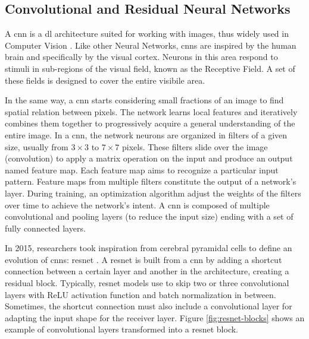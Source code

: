 \subsection{Convolutional and Residual Neural Networks}
\label{subsec:resnet}

A \gls{cnn} is a \gls{dl} architecture suited for working with images, thus widely used in Computer Vision \cite{Khan_2020}. Like other Neural Networks, \gls{cnn}s are inspired by the human brain and specifically by the visual cortex. Neurons in this area respond to stimuli in sub-regions of the visual field, known as the Receptive Field. A set of these fields is designed to cover the entire visibile area. 

In the same way, a \gls{cnn} starts considering small fractions of an image to find spatial relation between pixels. The network learns local features and iteratively combines them together to progressively acquire a general understanding of the entire image. In a \gls{cnn}, the network neurons are organized in filters of a given size, usually from $3 \times 3$ to $7 \times 7$ pixels. These filters slide over the image (convolution) to apply a matrix operation on the input and produce an output named feature map. Each feature map aims to recognize a particular input pattern. Feature maps from multiple filters constitute the output of a network's layer. During training, an optimization algorithm adjust the weights of the filters over time to achieve the network's intent. A \gls{cnn} is composed of multiple convolutional and pooling layers (to reduce the input size) ending with a set of fully connected layers.

\medskip

In 2015, researchers took inspiration from cerebral pyramidal cells to define an evolution of \gls{cnn}s: \gls{resnet} \cite{he2015deep}. A \gls{resnet} is built from a \gls{cnn} by adding a shortcut connection between a certain layer and another in the architecture, creating a residual block. Typically, \gls{resnet} models use to skip two or three convolutional layers with ReLU activation function \cite{act-relu} and batch normalization \cite{bacthnorm} in between. Sometimes, the shortcut connection must also include a convolutional layer for adapting the input shape for the receiver layer. Figure \ref{fig:resnet-blocks} shows an example of convolutional layers transformed into a \gls{resnet} block.

